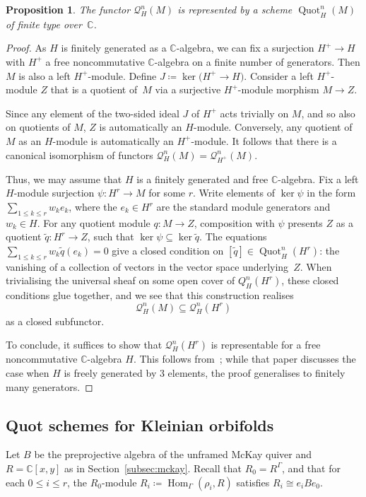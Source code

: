 \documentclass[pdftex]{sigma}%
\newtheorem{Proposition}[Theorem]{Proposition}
 { \theoremstyle{definition}
\newtheorem{Definition}[Theorem]{Definition}
\newtheorem{Example}[Theorem]{Example}
\newtheorem{Remark}[Theorem]{Remark}
\newtheorem{remarks}[theorem]{Remarks}
}
\newcommand{\SC}{\mathbb{C}} %
\newcommand{\C}{\SC} %
\newcommand{\Hom}{\operatorname{Hom}}
\newcommand{\PiGamma}{B}
\DeclareMathOperator{\Quot}{\mathrm{Quot}}
\numberwithin{equation}{section}
\begin{document}
\begin{Proposition}
\label{prop:Qnrep}
The functor $\mathcal{Q}^{n}_H(M)$ is represented by a scheme $\Quot^{n}_H(M)$
of finite type over~$\SC$.
\end{Proposition}
\begin{proof}
As $H$ is finitely generated as a $\SC$-algebra, we can fix a surjection $H^+\to H$ with $H^+$ a free noncommutative $\SC$-algebra on a finite number of generators.
Then $M$ is also a left $H^+$-module. Define $J\coloneqq \ker\big(H^+ \to H\big)$. Consider a left $H^+$-module $Z$ that is a quotient of~$M$ via a surjective $H^+$-module morphism $M \to Z$.

Since any element of the two-sided ideal $J$ of $H^+$ acts trivially on $M$, and so also on quotients of $M$, $Z$ is automatically an $H$-module. Conversely, any quotient of $M$ as an $H$-module is automatically an $H^{+}$-module. It follows that there is a canonical isomorphism of functors $\mathcal{Q}^n_H(M) = \mathcal Q^n_{H^+}(M)$.

Thus, we may assume that $H$ is a finitely generated and free $\C$-algebra.
Fix a left $H$-module surjection $\psi\colon H^r \to M$ for some $r$.
 Write elements of $\ker \psi$ in the form $\sum_{1\leq k \leq r} w_{k} e_k $, where the $e_k \in H^r$ are the standard module generators and $w_k \in H$.
 For any quotient module $q\colon M \to Z$, composition with $\psi$ presents $Z$ as a quotient $\tilde q\colon H^r \to Z$,
 such that $\ker \psi\subseteq\ker\tilde q$.
 The equations $\sum_{1\leq k \leq r} w_{k} \tilde q(e_k)=0$ give
 a closed condition on $[\tilde q]\in \Quot^n_H(H^r)$: the vanishing of a collection of vectors in the vector space underlying~$Z$.
 When trivialising the universal sheaf on some open cover of $Q^n_H(H^r)$, these closed conditions glue together, and
 we see that this construction realises
\[\mathcal{Q}^n_H(M) \subseteq \mathcal{Q}^n_H(H^r)\]
as a closed subfunctor.

To conclude, it suffices to show that $\mathcal{Q}^n_H(H^r)$ is representable for a free noncommutative $\SC$-algebra $H$. This follows from~\cite[Theorem 2.5]{beentjes2018virtual}; while that paper discusses the case when $H$ is freely generated by $3$ elements, the proof generalises to finitely many generators.
\end{proof}


\subsection{Quot schemes for Kleinian orbifolds}
\label{subsec:Quotorbi}
Let $\PiGamma$ be the preprojective algebra of the unframed McKay quiver and $R=\SC[x,y]$ as
in Section~\ref{subsec:mckay}.
Recall that $R_0=R^\Gamma$, and that for each $0\leq i \leq r$, the
$R_0$-module $R_i\coloneqq\Hom_\Gamma(\rho_i,R)$ satisfies $R_i\cong e_iBe_0$.
\end{document}
